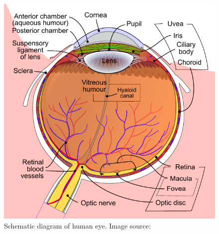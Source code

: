 \begin{figure}[htpb!]
\centering
\includegraphics[width=0.59\columnwidth]{images/other/eye_schematic}
\caption[Schematic diagram of the human eye]{Schematic diagram of human eye. Image source: \citet{eyeschematic}}
\label{fig:eye_schematic}
\end{figure}

